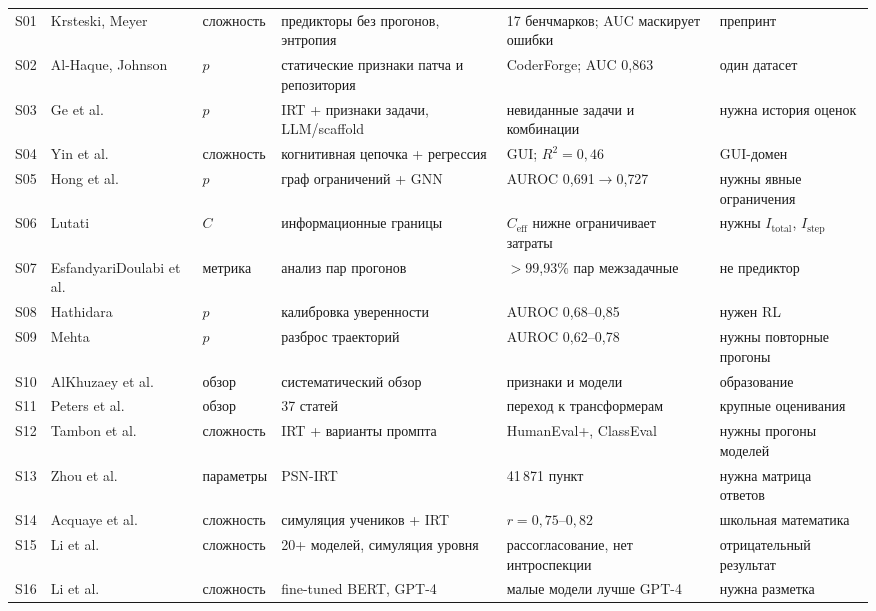 \documentclass[11pt,a4paper]{article}
\begin{document}
{\begin{longtable}{@{}p{0.7cm}p{3.0cm}p{2.2cm}p{3.1cm}p{3.5cm}p{2.3cm}@{}}
S01 & Krsteski, Meyer \cite{krsteski2026difficulty} & сложность & предикторы без прогонов, энтропия & 17 бенчмарков; AUC маскирует ошибки & препринт \\
S02 & Al-Haque, Johnson \cite{alhaque2026difficult} & $p$ & статические признаки патча и репозитория & CoderForge; AUC 0{,}863 & один датасет \\
S03 & Ge et al. \cite{ge2026psychometrics} & $p$ & IRT + признаки задачи, LLM/scaffold & невиданные задачи и комбинации & нужна история оценок \\
S04 & Yin et al. \cite{yin2025tasksense} & сложность & когнитивная цепочка + регрессия & GUI; $R^2=0{,}46$ & GUI-домен \\
S05 & Hong et al. \cite{hong2026circe} & $p$ & граф ограничений + GNN & AUROC 0{,}691$\to$0{,}727 & нужны явные ограничения \\
S06 & Lutati \cite{lutati2025capability} & $C$ & информационные границы & $C_{\text{eff}}$ нижне ограничивает затраты & нужны $I_{\text{total}}$, $I_{\text{step}}$ \\
S07 & EsfandyariDoulabi et al. \cite{esfandiaridoulabi2026disentangling} & метрика & анализ пар прогонов & $>$99{,}93\% пар межзадачные & не предиктор \\
S08 & Hathidara \cite{hathidara2026failure} & $p$ & калибровка уверенности & AUROC 0{,}68--0{,}85 & нужен RL \\
S09 & Mehta \cite{mehta2026disagree} & $p$ & разброс траекторий & AUROC 0{,}62--0{,}78 & нужны повторные прогоны \\
S10 & AlKhuzaey et al. \cite{alkhuzaey2024text} & обзор & систематический обзор & признаки и модели & образование \\
S11 & Peters et al. \cite{peters2025textbased} & обзор & 37 статей & переход к трансформерам & крупные оценивания \\
S12 & Tambon et al. \cite{tambon2026taskeval} & сложность & IRT + варианты промпта & HumanEval+, ClassEval & нужны прогоны моделей \\
S13 & Zhou et al. \cite{zhou2025lost} & параметры & PSN-IRT & 41\,871 пункт & нужна матрица ответов \\
S14 & Acquaye et al. \cite{acquaye2026calculators} & сложность & симуляция учеников + IRT & $r=0{,}75$--$0{,}82$ & школьная математика \\
S15 & Li et al. \cite{li2026struggles} & сложность & 20+ моделей, симуляция уровня & рассогласование, нет интроспекции & отрицательный результат \\
S16 & Li et al. \cite{li2025item} & сложность & fine-tuned BERT, GPT-4 & малые модели лучше GPT-4 & нужна разметка \\

\end{longtable}}
\end{document}
